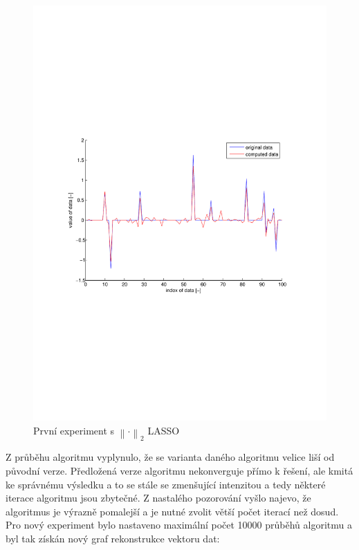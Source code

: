 \documentclass[FM,BP]{tulthesis}
\begin{document}
\begin{figure}[!ht]
	\begin{center}
		\includegraphics[scale=0.7]{obr/l2-firsttry.pdf}
	\end{center}
	\caption{První experiment s $\left\| \cdot \right\|_{2}$ LASSO}
	\label{fig:l2first}
\end{figure}

Z průběhu algoritmu vyplynulo, že se varianta daného algoritmu velice liší od původní verze. Předložená verze algoritmu nekonverguje přímo k řešení, ale kmitá ke správnému výsledku a to se stále se zmenšující intenzitou a tedy některé iterace algoritmu jsou zbytečné. Z nastalého pozorování vyšlo najevo, že algoritmus je výrazně pomalejší a je nutné zvolit větší počet iterací než dosud. Pro nový experiment bylo nastaveno maximální počet 10000 průběhů algoritmu a byl tak získán nový graf rekonstrukce vektoru dat:
\end{document}
